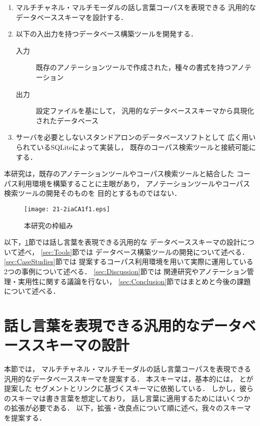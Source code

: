 \documentclass[japanese]{jnlp_1.4}
\begin{document}
\begin{enumerate}
 \item
マルチチャネル・マルチモーダルの話し言葉コーパスを表現できる
汎用的なデータベーススキーマを設計する．
 \item
以下の入出力を持つデータベース構築ツールを開発する．

\begin{description}
 \item[入力]
既存のアノテーションツールで作成された，種々の書式を持つアノテーション
 \item[出力]
設定ファイルを基にして，
汎用的なデータベーススキーマから具現化されたデータベース
\end{description}

 \item
サーバを必要としないスタンドアロンのデータベースソフトとして
広く用いられているSQLiteによって実装し，
既存のコーパス検索ツールと接続可能にする．
\end{enumerate}

本研究は，既存のアノテーションツールやコーパス検索ツールと結合した
コーパス利用環境を構築することに主眼があり，
アノテーションツールやコーパス検索ツールの開発そのものを
目的とするものではない．

\begin{figure}[t]
\begin{center}
\texttt{[image: 21-2iaCA1f1.eps]}
\end{center}
\caption{本研究の枠組み}
\label{fig:overview}
\end{figure}

以下，\ref{sec:DB}節では話し言葉を表現できる汎用的な
データベーススキーマの設計について述べ，
\ref{sec:Tools}節では
データベース構築ツールの開発について述べる．
\ref{sec:CaseStudies}節では
提案するコーパス利用環境を用いて実際に運用している
2つの事例について述べる．
\ref{sec:Discussion}節では
関連研究やアノテーション管理・実用性に関する議論を行ない，
\ref{sec:Conclusion}節ではまとめと今後の課題について述べる．


\section{話し言葉を表現できる汎用的なデータベーススキーマの設計}
\label{sec:DB}

本節では，
マルチチャネル・マルチモーダルの話し言葉コーパスを表現できる
汎用的なデータベーススキーマを提案する．
本スキーマは，基本的には，
    とが提案した
セグメントとリンクに基づくスキーマに依拠している．
しかし，彼らのスキーマは書き言葉を想定しており，
話し言葉に適用するためにはいくつかの拡張が必要である．
以下，拡張・改良点について順に述べ，我々のスキーマを提案する．
\end{document}
